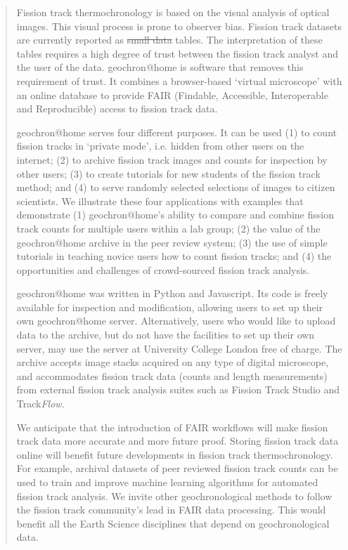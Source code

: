 \documentclass[gchron, manuscript]{copernicus}
\providecommand{\DIFaddtex}[1]{{\protect\color{blue}\uwave{#1}}} %
\providecommand{\DIFdeltex}[1]{{\protect\color{red}\sout{#1}}}                      %
\providecommand{\DIFaddbegin}{} %
\providecommand{\DIFaddend}{} %
\providecommand{\DIFdelbegin}{} %
\providecommand{\DIFdelend}{} %
\providecommand{\DIFadd}[1]{\texorpdfstring{\DIFaddtex{#1}}{#1}} %
\providecommand{\DIFdel}[1]{\texorpdfstring{\DIFdeltex{#1}}{}} %
\begin{document}
\begin{abstract}
Fission track thermochronology is based on the visual analysis of
optical images. This visual process is prone to observer bias. Fission
track datasets are currently reported as \DIFdelbegin \DIFdel{small data }\DIFdelend \DIFaddbegin \DIFadd{numerical summary }\DIFaddend tables. The
interpretation of these tables requires a high degree of trust between
the fission track analyst and the user of the data. geochron@home is
software that removes this requirement of trust. It combines a
browser-based `virtual microscope' with an online database to provide
FAIR (Findable, Accessible, Interoperable and Reproducible) access to
fission track data.\medskip

geochron@home serves four different purposes. It can be used (1) to
count fission tracks in `private mode', i.e. hidden from other users
on the internet; (2) to archive fission track images and counts for
inspection by other users; (3) to create tutorials for new students of
the fission track method; and (4) to serve randomly selected
selections of images to citizen scientists. We illustrate these four
applications with examples that demonstrate (1) geochron@home's
ability to compare and combine fission track counts for multiple users
within a lab group; (2) the value of the geochron@home archive in the
peer review system; (3) the use of simple tutorials in teaching novice
users how to count fission tracks; and (4) the opportunities and
challenges of crowd-sourced fission track analysis.\medskip

geochron@home was written in Python and Javascript. Its code is freely
available for inspection and modification, allowing users to set up
their own geochron@home server. Alternatively, users who would like to
upload data to the archive, but do not have the facilities to set up
their own server, may use the server at University College London free
of charge. The archive accepts image stacks acquired on any type of
digital microscope, and accommodates fission track data (counts and
length measurements) from external fission track analysis suites such
as Fission Track Studio and Track\emph{Flow}.\medskip

We anticipate that the introduction of FAIR workflows will make
fission track data more accurate and more future proof. Storing
fission track data online will benefit future developments in fission
track thermochronology. For example, archival datasets of peer
reviewed fission track counts can be used to train and improve machine
learning algorithms for automated fission track analysis. We invite
other geochronological methods to follow the fission track community's
lead in FAIR data processing. This would benefit all the Earth Science
disciplines that depend on geochronological data.
\end{abstract}
\end{document}
